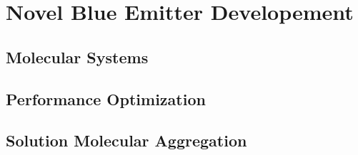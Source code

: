 \documentclass[../thesis.tex]{subfiles}
\begin{document}
\section{Novel Blue Emitter Developement}

\subsection{Molecular Systems}
\subsection{Performance Optimization}
\subsection{Solution Molecular Aggregation}



\end{document}
